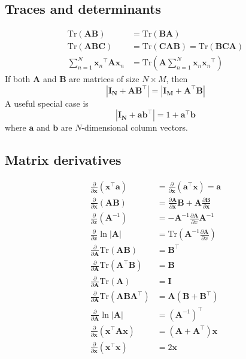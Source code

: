 \documentclass[a4paper]{report}
\newcommand{\up}{\mathrm}
\renewcommand{\bf}{\mathbf}
\begin{document}
\subsection{Traces and determinants}
\begin{align}
	\up{Tr}(\bf{AB}) &= \up{Tr}(\bf{BA}) \\
	\up{Tr}(\bf{ABC}) &= \up{Tr}(\bf{CAB}) = \up{Tr}(\bf{BCA})	\\
		\sum_{n=1}^{N} {\bf{x}_n}^{\intercal} \bf{A} \bf{x}_n &= \up{Tr}(\bf{A} \sum_{n=1}^{N} \bf{x}_n{\bf{x}_n}^{\intercal})
\end{align}
If both $\bf{A}$ and $\bf{B}$ are matrices of size $N \times M$, then
\begin{equation}
	|\bf{I_N+AB^{\intercal}}|=|\bf{I_M+A^{\intercal}B}|
\end{equation}
A useful special case is
\begin{equation}
	|\bf{I_N+ab^{\intercal}}|=1+\bf{a^{\intercal}b} \label{ide2}
\end{equation}
where $\bf{a}$ and $\bf{b}$ are $N$-dimensional column vectors.
\subsection{Matrix derivatives}
\begin{align}
	\frac{\partial}{\partial \bf{x}}(\bf{x}^{\intercal}\bf{a})&=\frac{\partial}{\partial \bf{x}}(\bf{a}^{\intercal}\bf{x})=\bf{a}\\
	\frac{\partial}{\partial \bf{x}}(\bf{AB}) &= \frac{\partial\bf{A}}{\partial \bf{x}}\bf{B} + \bf{A} \frac{\partial \bf{B}}{\partial \bf{x}}\\
	\frac{\partial}{\partial x}(\bf{A}^{-1})&=-\bf{A}^{-1}\frac{\partial \bf{A}}{\partial x}\bf{A}^{-1}\\
	\frac{\partial}{\partial x}\ln|\bf{A}| &= \up{Tr}\left(\bf{A}^{-1}\frac{\partial \bf{A}}{\partial x}\right)\\
	\frac{\partial}{\partial \bf{A}} \up{Tr}(\bf{AB}) &= \bf{B}^{\intercal}\\
	\frac{\partial}{\partial \bf{A}}\up{Tr}(\bf{A}^{\intercal}\bf{B})&= \bf{B}\\
	\frac{\partial}{\partial \bf{A}} \up{Tr}(\bf{A}) &= \bf{I }\\
	\frac{\partial}{\partial \bf{A}}\up{Tr}(\bf{ABA}^{\intercal}) &= \bf{A(B+B^{\intercal})}\\
	\frac{\partial}{\partial \bf{A}} \ln|\bf{A}| &= (\bf{A}^{-1})^{\intercal}\\
	\frac{\partial}{\partial \bf{x}}(\bf{x}^{\intercal}\bf{A}\bf{x}) &= (\bf{A+A}^{\intercal})\bf{x}\\
	\frac{\partial}{\partial \bf{x}}(\bf{x}^{\intercal}\bf{x}) &= 2\bf{x}
\end{align}
\end{document}
